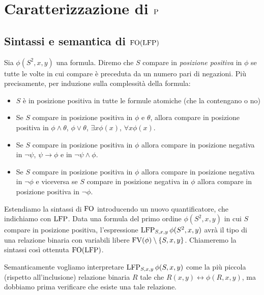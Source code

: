 \chapter{Caratterizzazione di \texorpdfstring{$\P$}{P}}

\section{Sintassi e semantica di \texorpdfstring{$\FO(\LFP)$}{FO(LFP)}}

\begin{definizione}
 Sia $\phi(S^2,x,y)$ una formula.
 Diremo che $S$ compare in \emph{posizione positiva} in $\phi$ se tutte le volte
 in cui compare è preceduta da un
 numero pari di negazioni. Più precisamente, per induzione sulla complessità
 della formula:
 \begin{itemize}
  \item $S$ è in posizione positiva in tutte le formule atomiche (che la contengano o no)
  \item Se $S$ compare in posizione positiva in $\phi$ e $\theta$, allora compare
  in posizione positiva in $\phi \land \theta$, $\phi \lor \theta$, $\exists x \phi(x)$,
  $\forall x \phi(x)$.
  \item Se $S$ compare in posizione positiva in $\phi$ allora compare in posizione
  negativa in $\lnot \psi$, $\psi \to \phi$ e in $\lnot \psi \land \phi$.
  \item Se $S$ compare in posizione positiva in $\phi$ allora compare in posizione
  negativa in $\lnot \phi$ e viceversa se $S$ compare in posizione negativa in $\phi$
  allora compare in posizione
  positiva in $\lnot \phi$.
 \end{itemize}
\end{definizione}


\begin{definizione}
 Estendiamo la sintassi di $\FO$ introducendo un nuovo quantificatore, che
 indichiamo con $\LFP$. Data una
 formula del primo ordine $\phi(S^2,x,y)$ in cui $S$ compare in posizione positiva,
 l'espressione $\LFP_{S,x,y} \phi(S^2,x,y)$ avrà il tipo di una relazione binaria
 con variabili
 libere $\FV(\phi) \setminus \{S,x,y\}$.
 Chiameremo la sintassi così ottenuta $\FO(\LFP)$.
\end{definizione}

Semanticamente vogliamo interpretare $\LFP_{S,x,y} \phi(S,x,y)$ come la più
piccola (rispetto all'inclusione) relazione binaria $R$ tale che $R(x,y) \leftrightarrow \phi(R,x,y)$, ma dobbiamo
prima verificare che esiste una tale relazione.

